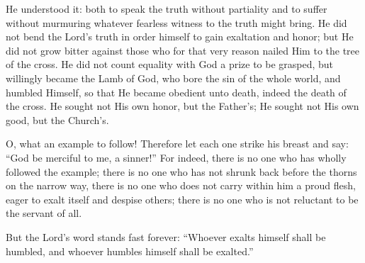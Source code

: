He understood it: both to speak the truth without partiality and to suffer without murmuring whatever fearless witness to the truth might bring. He did not bend the Lord’s truth in order himself to gain exaltation and honor; but He did not grow bitter against those who for that very reason nailed Him to the tree of the cross. He did not count equality with God a prize to be grasped, but willingly became the Lamb of God, who bore the sin of the whole world, and humbled Himself, so that He became obedient unto death, indeed the death of the cross. He sought not His own honor, but the Father’s; He sought not His own good, but the Church’s.

O, what an example to follow! Therefore let each one strike his breast and say: “God be merciful to me, a sinner!” For indeed, there is no one who has wholly followed the example; there is no one who has not shrunk back before the thorns on the narrow way, there is no one who does not carry within him a proud flesh, eager to exalt itself and despise others; there is no one who is not reluctant to be the servant of all.

But the Lord’s word stands fast forever: “Whoever exalts himself shall be humbled, and whoever humbles himself shall be exalted.”

